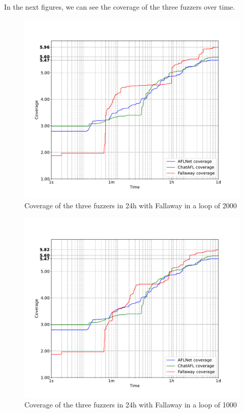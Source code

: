 In the next figures, we can see the coverage of the three fuzzers over time.
\begin{figure}[H]
    \centering
    \includegraphics[width=1\textwidth]{Images/coverage_over_time_lighttpd-1day-2000l.pdf}
    \caption{Coverage of the three fuzzers in 24h with Fallaway in a loop of 2000}
    \label{fig:coverage_1day_2000l}
\end{figure}

\begin{figure}[H]
    \centering
    \includegraphics[width=1\textwidth]{Images/coverage_over_time_lighttpd-1day-1000l.pdf}
    \caption{Coverage of the three fuzzers in 24h with Fallaway in a loop of 1000}
    \label{fig:coverage_1day_1000l}
\end{figure}


